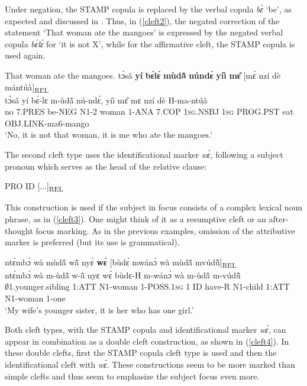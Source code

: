 Under negation, the STAMP copula is replaced by the verbal copula {\itshape bɛ̀} `be', as expected and discussed in . Thus, in (\ref{cleft2}), the negated correction of the statement `That woman ate the mangoes' is expressed by the negated verbal copula {\itshape bɛ́lɛ́} for `it is not X', while for the affirmative cleft, the STAMP copula is used again.

\begin{exe}
\ex \label{cleft2} That woman ate the mangoes.
  \glll tɔ̀sâ {\bfseries yí} {\bfseries bɛ́lɛ́} {\bfseries mùdã̂} {\bfseries núndɛ̀} {\bfseries yíì} {\bfseries mɛ̂} [mɛ̀ nzí dè mántúà]\textsubscript{REL}\\
        tɔ̀sâ yí bɛ̀-lɛ m-ùdã̂ nú-ndɛ̀, yíì mɛ̂ mɛ nzí dè H-ma-ntúà\\
       no 7.PRES be-NEG N1-2 woman 1-ANA 7.COP 1\textsc{sg}.NSBJ 1\textsc{sg} PROG.PST eat OBJ.LINK-ma6-mango \\ 
    \trans `No, it is not that woman, it is me who ate the mangoes.'
\end{exe}

The second cleft type uses the identificational marker {\itshape wɛ́}, following a subject pronoun which serves as the head of the relative clause:
\begin{center}
PRO ID [...]\textsubscript{REL}
\end{center}
This construction is used if the subject in focus consists of a complex lexical noun phrase, as in (\ref{cleft3}). One might think of it as a resumptive cleft or an after-thought focus marking. As in the previous examples, omission of the attributive marker is preferred (but its use is grammatical). 

\begin{exe} 
\ex\label{cleft3} 
  \glll ntɛ́mbɔ̀ wà mùdã̂ wã̂ nyɛ̀ {\bfseries wɛ́} [bùdɛ́ mwánɔ̀ wà mùdã̂ mvúdũ̂]\textsubscript{REL} \\
       ntɛ́mbɔ̀ wà m-ùdã̂ w-ã̂ nyɛ wɛ́ bùdɛ-H m-wánɔ̀ wà m-ùdã̂ m-vúdũ̂ \\
        $\emptyset$1.younger.sibling 1:ATT N1-woman 1-POSS.1\textsc{sg} 1 ID have-R N1-child 1:ATT N1-woman 1-one    \\
    \trans `My wife's younger sister, it is her who has one girl.'
\end{exe}


Both cleft types, with the STAMP copula and identificational marker {\itshape wɛ́}, can appear in combination as a double cleft construction, as shown in (\ref{cleft4}).  In these double clefts, first the STAMP copula cleft type is used and then the identificational cleft with {\itshape wɛ́}. These constructions seem to be more marked than simple clefts and thus seem to emphasize the subject focus even more.

